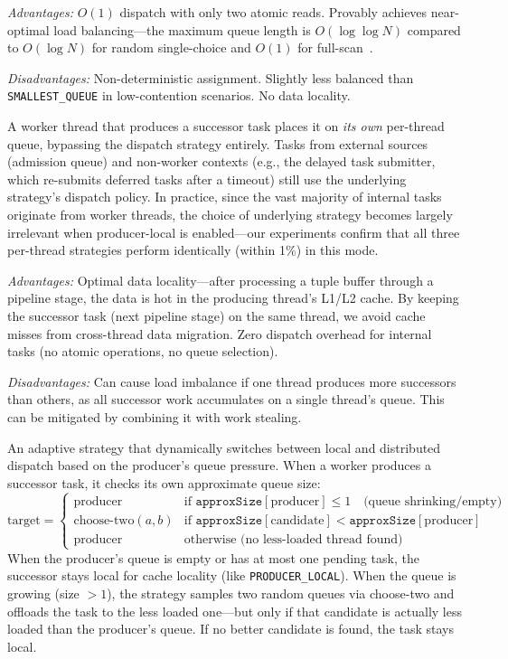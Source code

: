 \begin{description}
    \textit{Advantages:} $O(1)$ dispatch with only two atomic reads.
    Provably achieves near-optimal load balancing---the maximum queue length is $O(\log \log N)$ compared to $O(\log N)$ for random single-choice and $O(1)$ for full-scan~\cite{mitzenmacher2001power}.

    \textit{Disadvantages:} Non-deterministic assignment.
    Slightly less balanced than \texttt{SMALLEST\_QUEUE} in low-contention scenarios.
    No data locality.

    \item[\texttt{PRODUCER\_LOCAL}.]
    A worker thread that produces a successor task places it on \emph{its own} per-thread queue, bypassing the dispatch strategy entirely.
    Tasks from external sources (admission queue) and non-worker contexts (e.g., the delayed task submitter, which re-submits deferred tasks after a timeout) still use the underlying strategy's dispatch policy.
    In practice, since the vast majority of internal tasks originate from worker threads, the choice of underlying strategy becomes largely irrelevant when producer-local is enabled---our experiments confirm that all three per-thread strategies perform identically (within 1\%) in this mode.

    \textit{Advantages:} Optimal data locality---after processing a tuple buffer through a pipeline stage, the data is hot in the producing thread's L1/L2 cache.
    By keeping the successor task (next pipeline stage) on the same thread, we avoid cache misses from cross-thread data migration.
    Zero dispatch overhead for internal tasks (no atomic operations, no queue selection).

    \textit{Disadvantages:} Can cause load imbalance if one thread produces more successors than others, as all successor work accumulates on a single thread's queue.
    This can be mitigated by combining it with work stealing.

    \item[\texttt{PER\_THREAD\_ADAPTIVE}.]
    An adaptive strategy that dynamically switches between local and distributed dispatch based on the producer's queue pressure.
    When a worker produces a successor task, it checks its own approximate queue size:
    \[
        \text{target} =
        \begin{cases}
            \text{producer} & \text{if } \texttt{approxSize}[\text{producer}] \leq 1 \quad \text{(queue shrinking/empty)} \\
            \text{choose-two}(a, b) & \text{if } \texttt{approxSize}[\text{candidate}] < \texttt{approxSize}[\text{producer}] \\
            \text{producer} & \text{otherwise (no less-loaded thread found)}
        \end{cases}
    \]
    When the producer's queue is empty or has at most one pending task, the successor stays local for cache locality (like \texttt{PRODUCER\_LOCAL}).
    When the queue is growing (size $> 1$), the strategy samples two random queues via choose-two and offloads the task to the less loaded one---but only if that candidate is actually less loaded than the producer's queue.
    If no better candidate is found, the task stays local.


\end{description}
